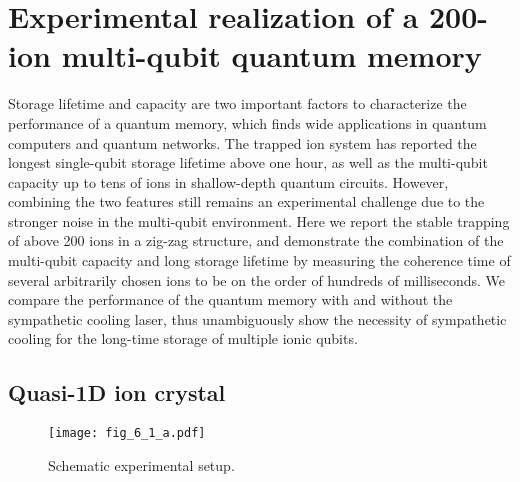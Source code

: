 
\chapter{Experimental realization of a 200-ion multi-qubit quantum memory}

Storage lifetime and capacity are two important factors to characterize the performance of a quantum memory, which finds wide applications in quantum computers and quantum networks. The trapped ion system has reported the longest single-qubit storage lifetime above one hour, as well as the multi-qubit capacity up to tens of ions in shallow-depth quantum circuits. However, combining the two features still remains an experimental challenge due to the stronger noise in the multi-qubit environment. Here we report the stable trapping of above 200 ions in a zig-zag structure, and demonstrate the combination of the multi-qubit capacity and long storage lifetime by measuring the coherence time of several arbitrarily chosen ions to be on the order of hundreds of milliseconds. We compare the performance of the quantum memory with and without the sympathetic cooling laser, thus unambiguously show the necessity of sympathetic cooling for the long-time storage of multiple ionic qubits.



\section{Quasi-1D ion crystal}

\begin{figure}
    \centering
    \texttt{[image: fig\_6\_1\_a.pdf]}
    \caption{Schematic experimental setup.}
    \label{fig:6_1_a}
\end{figure}

